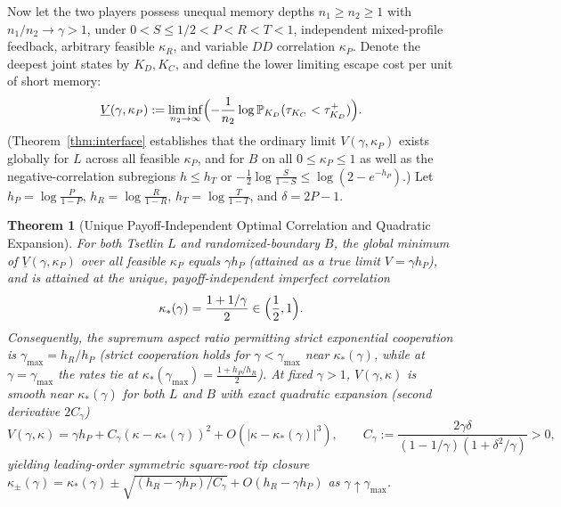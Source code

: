 \documentclass[11pt,reqno]{amsart}
\newtheorem{theorem}{Theorem}[section]
\theoremstyle{definition}
\theoremstyle{remark}
\newcommand{\Prob}{\mathbb{P}}
\begin{document}
Now let the two players possess unequal memory depths $n_1 \ge n_2 \ge 1$ with $n_1/n_2 \to \gamma > 1$, under $0 < S \le 1/2 < P < R < T < 1$, independent mixed-profile feedback, arbitrary feasible $\kappa_R$, and variable $DD$ correlation $\kappa_P$. Denote the deepest joint states by $K_D, K_C$, and define the lower limiting escape cost per unit of short memory:
\[
  \underline{V}(\gamma, \kappa_P) := \liminf_{n_2 \to \infty} \Bigl(-\frac{1}{n_2}\log \Prob_{K_D}(\tau_{K_C} < \tau_{K_D}^+)\Bigr).
\]
(Theorem~\ref{thm:interface} establishes that the ordinary limit $V(\gamma,\kappa_P)$ exists globally for $L$ across all feasible $\kappa_P$, and for $B$ on all $0 \le \kappa_P \le 1$ as well as the negative-correlation subregions $h \le h_T$ or $-\frac{1}{2}\log\frac{S}{1-S} \le \log(2-e^{-h_P})$.) Let $h_P = \log\frac{P}{1-P}$, $h_R = \log\frac{R}{1-R}$, $h_T = \log\frac{T}{1-T}$, and $\delta = 2P-1$.

\begin{theorem}[Unique Payoff-Independent Optimal Correlation and Quadratic Expansion]\label{thm:optimal-corr}
For both Tsetlin $L$ and randomized-boundary $B$, the global minimum of $\underline{V}(\gamma, \kappa_P)$ over all feasible $\kappa_P$ equals $\gamma h_P$ (attained as a true limit $V = \gamma h_P$), and is attained at the \emph{unique}, payoff-independent imperfect correlation
\begin{equation}\label{eq:kstar}
  \kappa_*(\gamma) = \frac{1 + 1/\gamma}{2} \in \Bigl(\frac{1}{2}, 1\Bigr).
\end{equation}
Consequently, the supremum aspect ratio permitting strict exponential cooperation is $\gamma_{\max} = h_R / h_P$ (strict cooperation holds for $\gamma < \gamma_{\max}$ near $\kappa_*(\gamma)$, while at $\gamma = \gamma_{\max}$ the rates tie at $\kappa_*(\gamma_{\max}) = \frac{1+h_P/h_R}{2}$). At fixed $\gamma > 1$, $V(\gamma,\kappa)$ is smooth near $\kappa_*(\gamma)$ for both $L$ and $B$ with exact quadratic expansion (second derivative $2 C_\gamma$)
\begin{equation}\label{eq:curvature}
  V(\gamma, \kappa) = \gamma h_P + C_\gamma (\kappa - \kappa_*(\gamma))^2 + O(|\kappa - \kappa_*(\gamma)|^3), \qquad
  C_\gamma := \frac{2\gamma\delta}{(1 - 1/\gamma)(1 + \delta^2/\gamma)} > 0,
\end{equation}
yielding leading-order symmetric square-root tip closure $\kappa_\pm(\gamma) = \kappa_*(\gamma) \pm \sqrt{(h_R - \gamma h_P)/C_\gamma} + O(h_R - \gamma h_P)$ as $\gamma \uparrow \gamma_{\max}$.
\end{theorem}
\end{document}
